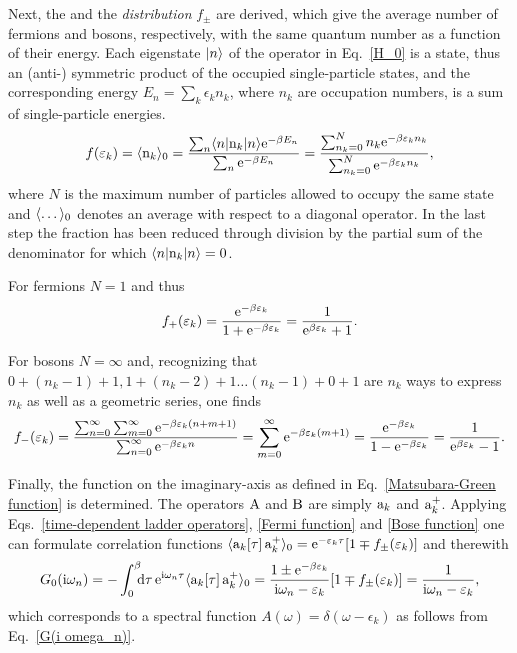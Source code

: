 Next, the \emph{} and the \emph{
distribution} $f_\pm$ are derived, which give the average number of fermions and
bosons, respectively, with the same quantum number as a function of their
energy. Each eigenstate $|n\rangle$ of the  operator in
Eq.~\ref{H_0} is a  state, thus an (anti-) symmetric product of the
occupied single-particle states, and the corresponding energy $E_n = \sum_k
\epsilon_k n_k$, where $n_k$ are occupation numbers, is a sum of single-particle
energies.
%
\begin{equation*}
    f(\varepsilon_k) = \langle\mathrm n_k\rangle_0
    = \frac{\sum_n \langle n| \mathrm n_k |n\rangle \mathrm e^{-\beta E_n}}
        {\sum_n \mathrm e^{-\beta E_n}}
    = \frac{\sum_{n_k = 0}^N n_k \mathrm e^{-\beta \varepsilon_k n_k}}
        {\sum_{n_k = 0}^N \mathrm e^{-\beta \varepsilon_k n_k}},
\end{equation*}
%
where $N$ is the maximum number of particles allowed to occupy the same state
and $\langle\dots\rangle_0$ denotes an average with respect to a diagonal 
operator. In the last step the fraction has been reduced through division by the
partial sum of the denominator for which $\langle n| \mathrm n_k |n\rangle = 0$.

For fermions $N = 1$ and thus
%
\begin{equation} \label{Fermi function}
    f_+(\varepsilon_k) = \frac{\mathrm e^{-\beta \varepsilon_k}}{1 + \mathrm e^{-\beta \varepsilon_k}}
    = \frac 1 {\mathrm e^{\beta \varepsilon_k} + 1}.
\end{equation}

For bosons $N = \infty$ and, recognizing that $0 + (n_k - 1) + 1, 1 + (n_k - 2)
+ 1 \dots (n_k - 1) + 0 + 1$ are $n_k$ ways to express $n_k$ as well as a
geometric series, one finds
%
\begin{equation} \label{Bose function}
    f_-(\varepsilon_k)
    = \frac {\sum_{n = 0}^\infty \sum_{m = 0}^\infty
        \mathrm e^{-\beta \varepsilon_k (n + m + 1)}}
        {\sum_{n = 0}^\infty \mathrm e^{-\beta \varepsilon_k n}}
    = \sum_{m = 0}^\infty \mathrm e^{-\beta \varepsilon_k (m + 1)}
    = \frac{\mathrm e^{-\beta \varepsilon_k}}{1 - \mathrm e^{-\beta \varepsilon_k}}
    = \frac 1 {\mathrm e^{\beta \varepsilon_k} - 1}.
\end{equation}

Finally, the  function on the imaginary-axis as defined in
Eq.~\ref{Matsubara-Green function} is determined. The operators $\mathrm A$ and $\mathrm
B$ are simply $\mathrm a_k$ and $\mathrm a_k^+$. Applying Eqs.~\ref{time-dependent
ladder operators}, \ref{Fermi function} and \ref{Bose function} one can
formulate correlation functions $\langle\mathrm a_k[\tau] \, \mathrm a_k^+\rangle_0 =
\mathrm e^{-\varepsilon_k \tau} [1 \mp f_\pm(\varepsilon_k)]$ and therewith
%
\begin{equation} \label{G_0(i omega_n)}
    G_0(\I \omega_n) = -\int \from 0 \till \beta \D \tau \,
    \E^{\I \omega_n \tau} \av{\op a_k[\tau] \, \op a_k^+}_0
    = \frac{1 \pm \E^{-\beta \epsilon_k}}{\I \omega_n - \epsilon_k}
        [1 \mp f_\pm(\epsilon_k)]
    = \frac 1 {\I \omega_n - \epsilon_k},
\end{equation}
%
which corresponds to a spectral function $A(\omega) = \delta(\omega -
\epsilon_k)$ as follows from Eq.~\ref{G(i omega_n)}.


